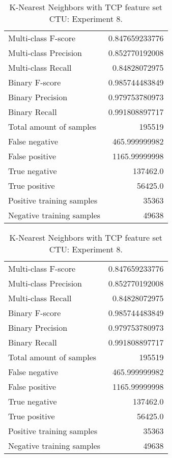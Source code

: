 \begin{table}[H]
\begin{minipage}{0.5\textwidth}
\caption{K-Nearest Neighbors with TCP feature set CTU: Experiment 7.}
\centering
\begin{tabular}{l r}
\toprule
Multi-class F-score & 0.847659233776 \\
Multi-class Precision & 0.852770192008 \\
Multi-class Recall & 0.84828072975 \\
\midrule
Binary F-score & 0.985744483849 \\
Binary Precision & 0.979753780973 \\
Binary Recall & 0.991808897717 \\
\midrule
Total amount of samples & 195519 \\
False negative & 465.999999982 \\
False positive & 1165.99999998 \\
True negative & 137462.0 \\
True positive & 56425.0 \\
\midrule
Positive training samples & 35363 \\
Negative training samples & 49638 \\
\bottomrule
\end{tabular}
\end{minipage}
\hfillx
\begin{minipage}{0.5\textwidth}
\caption{K-Nearest Neighbors with TCP feature set CTU: Experiment 8.}
\centering
\begin{tabular}{l r}
\toprule
Multi-class F-score & 0.847659233776 \\
Multi-class Precision & 0.852770192008 \\
Multi-class Recall & 0.84828072975 \\
\midrule
Binary F-score & 0.985744483849 \\
Binary Precision & 0.979753780973 \\
Binary Recall & 0.991808897717 \\
\midrule
Total amount of samples & 195519 \\
False negative & 465.999999982 \\
False positive & 1165.99999998 \\
True negative & 137462.0 \\
True positive & 56425.0 \\
\midrule
Positive training samples & 35363 \\
Negative training samples & 49638 \\
\bottomrule
\end{tabular}
\end{minipage}
\end{table}
